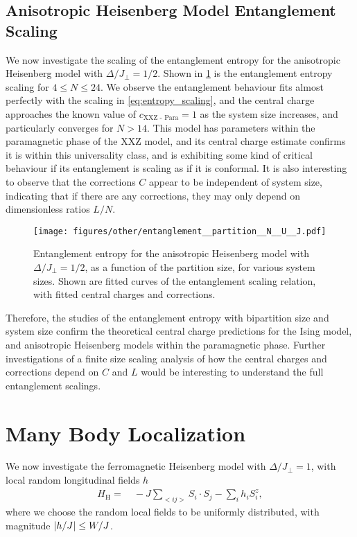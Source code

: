 \documentclass[12pt]{article}{}
\begin{document}
\subsection{Anisotropic Heisenberg Model Entanglement Scaling}
We now investigate the scaling of the entanglement entropy for the anisotropic Heisenberg model with $\Delta/J_{\perp} = 1/2$. Shown in \cref{fig:other_entanglement_partition} is the entanglement entropy scaling for $4 \leq N \leq 24$. We observe the entanglement behaviour fits almost perfectly with the scaling in \cref{eq:entropy_scaling}, and the central charge approaches the known value \cite{Cole2017} of $\boxed{c_{\textrm{XXZ - Para}} = 1}$ as the system size increases, and particularly converges for $N>14$. This model has parameters within the paramagnetic phase of the XXZ model, and its central charge estimate confirms it is within this universality class, and is exhibiting some kind of critical behaviour if its entanglement is scaling as if it is conformal. It is also interesting to observe that the corrections $C$ appear to be independent of system size, indicating that if there are any corrections, they may only depend on dimensionless ratios $L/N$.
\begin{figure}[H]
  \centering
  \texttt{[image: figures/other/entanglement\_\_partition\_\_N\_\_U\_\_J.pdf]}
  \caption{Entanglement entropy for the anisotropic Heisenberg model with $\Delta/J_{\perp} = 1/2$, as a function of the partition size, for various system sizes. Shown are fitted curves of the entanglement scaling relation, with fitted central charges and corrections.}
  \label{fig:other_entanglement_partition}
\end{figure}
Therefore, the studies of the entanglement entropy with bipartition size and system size confirm the theoretical central charge predictions for the Ising model, and anisotropic Heisenberg models within the paramagnetic phase. Further investigations of a finite size scaling analysis of how the central charges and corrections depend on $C$ and $L$ would be interesting to understand the full entanglement scalings.




\newpage
\section{Many Body Localization}
We now investigate the ferromagnetic Heisenberg model with $\Delta/J_{\perp} = 1$, with local random longitudinal fields $h$
\begin{align}
  H_{\textrm{H}} =&~ -J\sum_{<ij>} S_{i} \cdot S_{j} - \sum_{i} h_{i}S^{z}_{i}, \label{eq:heisenberg_hamiltonian}
\end{align}
where we choose the random local fields to be uniformly distributed, with magnitude $\abs{h/J} \leq W/J$.
\end{document}
